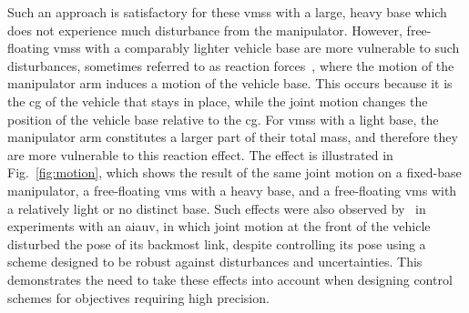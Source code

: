 \documentclass[../main.tex]{subfiles}
\begin{document}
Such an approach is satisfactory for these \glspl{vms} with a large, heavy base which does not experience much disturbance from the manipulator. However, free-floating \glspl{vms} with a comparably lighter vehicle base are more vulnerable to such disturbances, sometimes referred to as reaction forces~\citep{Umetani1989}, where the motion of the manipulator arm induces a motion of the vehicle base. This occurs because it is the \gls{cg} of the vehicle that stays in place, while the joint motion changes the position of the vehicle base relative to the \gls{cg}. For \glspl{vms} with a light base, the manipulator arm constitutes a larger part of their total mass, and therefore they are more vulnerable to this reaction effect. The effect is illustrated in Fig.~\ref{fig:motion}, which shows the result of the same joint motion on a fixed-base manipulator, a free-floating \gls{vms} with a heavy base, and a free-floating \gls{vms} with a relatively light or no distinct base. Such effects were also observed by~\cite{Borlaug2021} in experiments with an \gls{aiauv}, in which joint motion at the front of the vehicle disturbed the pose of its backmost link, despite controlling its pose using a scheme designed to be robust against disturbances and uncertainties. %
This demonstrates the need to take these effects into account when designing control schemes for objectives requiring high precision.




\end{document}

